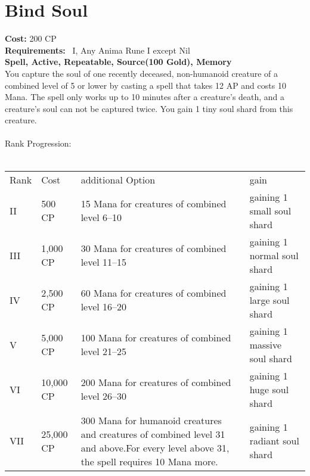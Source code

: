 \section{Bind Soul}
\textbf{Cost:} 200 CP\\
\textbf{Requirements:}~ I, Any Anima Rune I except Nil\\
\textbf{Spell, Active, Repeatable, Source(100 Gold), Memory}\\
You capture the soul of one recently deceased, non-humanoid creature of a combined level of 5 or lower by casting a spell that takes 12 AP and costs 10 Mana.
The spell only works up to 10 minutes after a creature's death, and a creature's soul can not be captured twice.
You gain 1 tiny soul shard from this creature.\\
\\
Rank Progression:\\
\\
\begin{tabular}{l | l | p{5.5cm} | p{2.5cm}}
    Rank & Cost & additional Option & gain\\
    II & 500 CP & 15 Mana for creatures of combined level 6--10 & gaining 1 small soul shard\\
    III & 1,000 CP & 30 Mana for creatures of combined level 11--15 & gaining 1 normal soul shard\\
    IV & 2,500 CP & 60 Mana for creatures of combined level 16--20 & gaining 1 large soul shard\\
    V & 5,000 CP & 100 Mana for creatures of combined level 21--25 & gaining 1 massive soul shard\\
    VI & 10,000 CP & 200 Mana for creatures of combined level 26--30 & gaining 1 huge soul shard\\
    VII & 25,000 CP & 300 Mana for humanoid creatures and creatures of combined level 31 and above.\linebreak For every level above 31, the spell requires 10 Mana more. & gaining 1 radiant soul shard\\
\end{tabular}